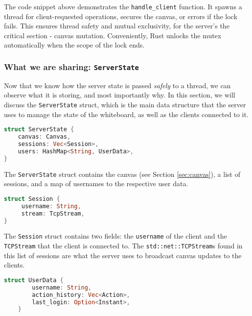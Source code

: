 \documentclass{article}
\newcommand{\code}[1]{\texttt{#1}}
\begin{document}
The code snippet above demonstrates the \code{handle\_client} function. It spawns a
thread for client-requested operations, secures the canvas, or errors if the
lock fails.  This ensures thread safety and mutual exclusivity, for the server's
the critical section - canvas mutation. Conveniently, Rust unlocks the mutex
automatically when the scope of the lock ends.

\label{sec:serverstate}
\subsubsection{What we are sharing: \code{ServerState}}

Now that we know how the server state is passed \textit{safely} to a thread, we
can observe what it is storing, and most importantly why. In this section, we
will discuss the \code{ServerState} struct, which is the main data structure
that the server uses to manage the state of the whiteboard, as well as the
clients connected to it.

\begin{subbox}{}
    \lstset{xleftmargin=0.2\textwidth, xrightmargin=0.2\textwidth}
    \begin{lstlisting}[language=Rust]
struct ServerState {
    canvas: Canvas,
    sessions: Vec<Session>,
    users: HashMap<String, UserData>,
}
    \end{lstlisting}
\end{subbox}

The \code{ServerState} struct contains the canvas (see Section
\ref{sec:canvas}), a list of sessions, and a map of usernames to the
respective user data.

\begin{subbox}{}
    \lstset{xleftmargin=0.2\textwidth, xrightmargin=0.2\textwidth}
    \begin{lstlisting}[language=Rust]
 struct Session {
     username: String,
     stream: TcpStream,
}
    \end{lstlisting}
\end{subbox}

The \code{Session} struct contains two fields: the \code{username} of the client
and the \code{TCPStream} that the client is connected to. The
\code{std::net::TCPStream}s found in this list of sessions are what the server
uses to broadcast canvas updates to the clients.

\begin{subbox}{}
    \lstset{xleftmargin=0.2\textwidth, xrightmargin=0.2\textwidth}
    \begin{lstlisting}[language=Rust]
struct UserData {
        username: String,
        action_history: Vec<Action>,
        last_login: Option<Instant>,
    }
\end{lstlisting}
\end{subbox}
\end{document}
